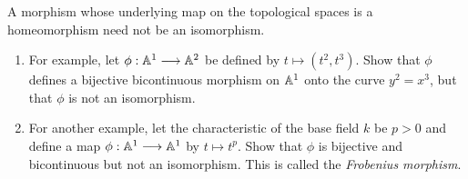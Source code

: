 \label{1.3.2}

A morphism whose underlying map on the topological spaces is a homeomorphism need not be an isomorphism.

\begin{enumerate}[label = (\alph*)]
    \item For example, let $\phi: \mathbb A^1 \longrightarrow \mathbb A^2$ be defined by $t \mapsto (t^2, t^3)$. Show that $\phi$ defines a bijective bicontinuous morphism on $\mathbb A^1$ onto the curve $y^2 = x^3$, but that $\phi$ is not an isomorphism.

    \item For another example, let the characteristic of the base field $k$ be $p > 0$ and define a map $\phi: \mathbb A^1 \longrightarrow \mathbb A^1$ by $t \mapsto t^p$. Show that $\phi$ is bijective and bicontinuous but not an isomorphism. This is called the \emph{Frobenius morphism}.
\end{enumerate}

